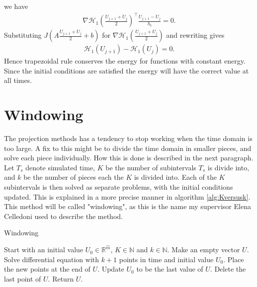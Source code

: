 \noindent we have
\begin{equation*}
\begin{aligned}
\nabla \mathcal{H}_1 (\frac{U_{j+1}  + U_j}{2}) ^\top \frac{U_{j+1} - U_j}{ h_t } = 0.
\end{aligned}
\end{equation*}
\noindent Substituting $ J (A\frac{U_{j+1}  + U_j}{2}  + b) $ for $\nabla \mathcal{H}_1 (\frac{U_{j+1}  + U_j}{2})$ and rewriting gives
\begin{equation*}
\begin{aligned}
\mathcal{H}_1(U_{j+1}) - \mathcal{H}_1(U_{j}) = 0.
\end{aligned}
\end{equation*}
\noindent Hence trapezoidal rule conserves the energy for functions with constant energy. Since the initial conditions are satisfied the energy will have the correct value at all times.

\section{Windowing}%
\noindent The projection methods has a tendency to stop working when the time domain is too large. A fix to this might be to divide the time domain in smaller pieces, and solve each piece individually. How this is done is described in the next paragraph.\\ 

\noindent Let $T_s$ denote simulated time, $K$ be the number of subintervals $T_s$ is divide into, and $k$ be the number of pieces each the $K$ is divided into. Each of the $K$ subintervals is then solved as separate problems, with the initial conditions updated. This is explained in a more precise manner in algorithm \ref{alg:Kversusk}. This method will be called "windowing", as this is the name my supervisor Elena Celledoni \cite{elenaperson} used to describe the method.

\begin{algorithm} [h!]
\begin{algorithmic} \caption{ Windowing } \label{alg:Kversusk}  
\STATE Start with an initial value $U_0 \in \mathbb{R}^{\hat{m}}$, $K \in \mathbb{N}$ and $k \in \mathbb{N}$.
\STATE Make an empty vector $U$.
   \STATE Solve differential equation with $k+1$ points in time and initial value $U_0$.
   \STATE Place the new points at the end of $U$.
   \STATE Update $U_0$ to be the last value of $U$.
   \STATE Delete the last point of $U$.
\ENDFOR
\STATE Return $U$.
\end{algorithmic} 
\end{algorithm}

